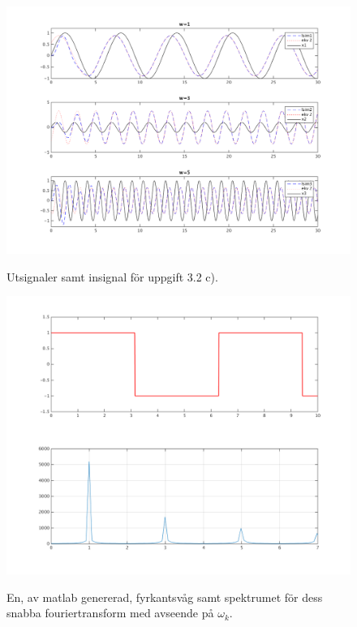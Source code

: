 \begin{figure}
    \caption{Utsignaler samt insignal för uppgift 3.2 c).}
    \centering
    \includegraphics[scale=0.55]{figures/task2c-three-waves.png}
    \label{fig:task2c-three-waves}
\end{figure}

\begin{figure}
    \caption{En, av matlab genererad, fyrkantsvåg samt spektrumet för dess
    snabba fouriertransform med avseende på $\omega_k$.}
    \centering
    \includegraphics[scale=0.55]{figures/task3c-square-+-fk.png}
    \label{fig:task3c-square-+-fk}
\end{figure}

